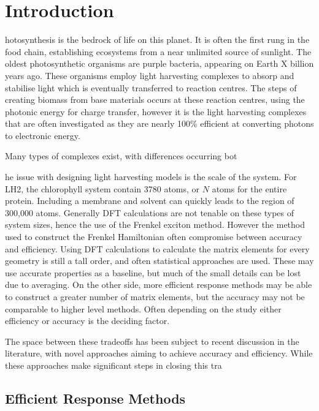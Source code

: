 %
%
\chapter{Introduction}
\label{chap:intro}

hotosynthesis is the bedrock of life on this planet. It is often the 
first rung in the food chain, establishing ecosystems from a near unlimited source 
of sunlight. The oldest photosynthetic organisms are purple bacteria, appearing
on Earth X billion years ago. These organisms employ light harvesting complexes 
to absorp and stabilise light which is eventually transferred to reaction centres.
The steps of creating biomass from base materials occurs at these reaction centres,
using the photonic energy for charge transfer, however it is the light harvesting
complexes that are often investigated as they are nearly 100\% efficient at converting
photons to electronic energy.

Many types of complexes exist, with differences occurring bot



he issue with designing light harvesting models is the scale of the system.
For LH2, the chlorophyll system contain 3780 atoms, or $N$ atoms for the entire protein.
Including a membrane and solvent can quickly leads to the region of 300,000 atoms.
Generally DFT calculations are not tenable on these types of system sizes, hence 
the use of the Frenkel exciton method. However the method used to construct the 
Frenkel Hamiltonian often compromise between accuracy and efficiency. Using DFT
calculations to calculate the matrix elements for every geometry is still a tall
order, and often statistical approaches are used. These may use accurate properties
as a baseline, but much of the small details can be lost due to averaging. On the
other side, more efficient response methods may be able to construct a greater number
of matrix elements, but the accuracy may not be comparable to higher level methods.
Often depending on the study either efficiency or accuracy is the deciding factor.

The space between these tradeoffs has been subject to recent discussion in the literature,
with novel approaches aiming to achieve accuracy and efficiency. While these approaches
make significant steps in closing this tra

\section{Efficient Response Methods}
\label{sec:efficient_response_methods}

